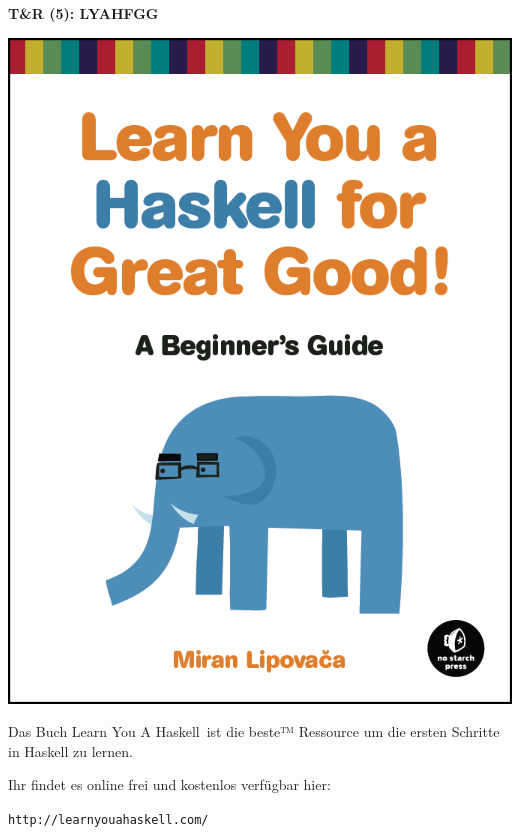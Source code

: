 \documentclass[unknownkeysallowed]{beamer}
\begin{document}
  \begin{frame}
    \Large\textbf{T\&R (5): LYAHFGG}\bigskip \normalsize
    
    \begin{multicols}{2}
    \begin{center}
	\includegraphics[scale=0.15]{lyah.png} 
	\end{center}
	
	\columnbreak    
    Das Buch \glqq Learn You A Haskell\grqq\ ist die beste™ Ressource um die ersten 
    Schritte in Haskell zu lernen. \bigskip
   
    Ihr findet es online frei und kostenlos verfügbar hier:
    
    \texttt{http://learnyouahaskell.com/}
    \end{multicols}
  \end{frame}
\end{document}
